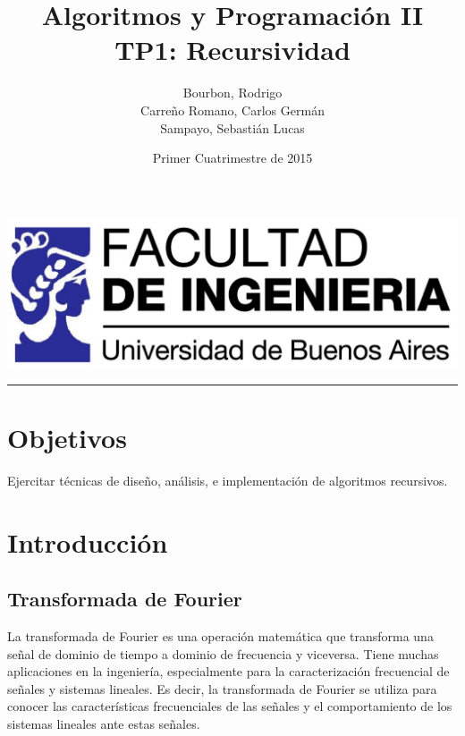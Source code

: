 \documentclass{article}
\begin{document}
\title{Algoritmos y Programación II\\
       TP1: Recursividad}
\author{Bourbon, Rodrigo\\
        Carreño Romano, Carlos Germán\\
        Sampayo, Sebastián Lucas}
\date{Primer Cuatrimestre de 2015}
\maketitle

\begin{center}
  \includegraphics[width=0.5\paperwidth]{Imagenes/logo_fiuba_HD}
  \rule[0.5ex]{0.8\paperwidth}{0.1pt}
\par
\end{center}



\newpage{}
\vfill{}
\tableofcontents{}
\vfill{}
\newpage{}


\section{Objetivos}
  Ejercitar técnicas de diseño, análisis, e implementación de algoritmos recursivos.

\section{Introducción}
  \subsection{Transformada de Fourier}
    La transformada de Fourier es una operación matemática que transforma una señal de dominio
    de tiempo a dominio de frecuencia y viceversa. Tiene muchas aplicaciones en la ingeniería,
    especialmente para la caracterización frecuencial de señales y sistemas lineales.
    Es decir, la transformada de Fourier se utiliza para conocer las características
    frecuenciales de las señales y el comportamiento de los sistemas lineales ante estas
    señales.
\end{document}
